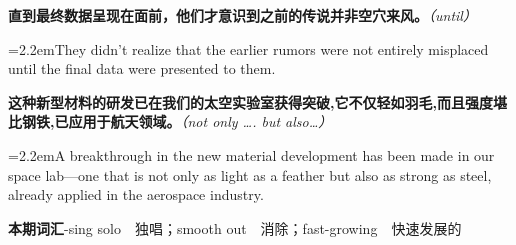 \documentclass[11pt,a4paper]{article}
\newcommand{\num}[1]{\makebox[1.9em][r]{#1.}\hspace{0.3em}}
\newcommand{\prompt}[1]{\emph{\textcolor{tipblue}{\small（#1）}}}
\begin{document}
\begin{minipage}{\linewidth}

\num{19}\textbf{直到最终数据呈现在面前，他们才意识到之前的传说并非空穴来风。}\prompt{until}

\vspace{0.15em}

\noindent\hangindent=2.2em\hspace{2.2em}They didn’t realize that the earlier rumors were not entirely misplaced until the final data were presented to them.

\end{minipage}

\begin{minipage}{\linewidth}

\num{20}\textbf{这种新型材料的研发已在我们的太空实验室获得突破,它不仅轻如羽毛,而且强度堪比钢铁,已应用于航天领域。}\prompt{not only …. but also…}

\vspace{0.15em}

\noindent\hangindent=2.2em\hspace{2.2em}A breakthrough in the new material development has been made in our space lab—one that is not only as light as a feather but also as strong as steel, already applied in the aerospace industry.

\end{minipage}

\num{21}\textbf{本期词汇}\quad -sing solo　独唱；smooth out　消除；fast-growing　快速发展的
\end{document}
